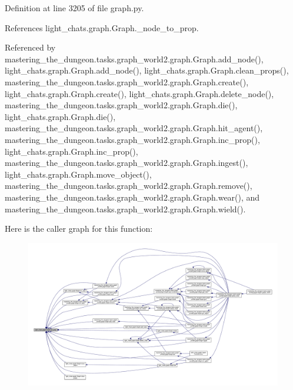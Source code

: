 Definition at line 3205 of file graph.\+py.



References light\+\_\+chats.\+graph.\+Graph.\+\_\+node\+\_\+to\+\_\+prop.



Referenced by mastering\+\_\+the\+\_\+dungeon.\+tasks.\+graph\+\_\+world2.\+graph.\+Graph.\+add\+\_\+node(), light\+\_\+chats.\+graph.\+Graph.\+add\+\_\+node(), light\+\_\+chats.\+graph.\+Graph.\+clean\+\_\+props(), mastering\+\_\+the\+\_\+dungeon.\+tasks.\+graph\+\_\+world2.\+graph.\+Graph.\+create(), light\+\_\+chats.\+graph.\+Graph.\+create(), light\+\_\+chats.\+graph.\+Graph.\+delete\+\_\+node(), mastering\+\_\+the\+\_\+dungeon.\+tasks.\+graph\+\_\+world2.\+graph.\+Graph.\+die(), light\+\_\+chats.\+graph.\+Graph.\+die(), mastering\+\_\+the\+\_\+dungeon.\+tasks.\+graph\+\_\+world2.\+graph.\+Graph.\+hit\+\_\+agent(), mastering\+\_\+the\+\_\+dungeon.\+tasks.\+graph\+\_\+world2.\+graph.\+Graph.\+inc\+\_\+prop(), light\+\_\+chats.\+graph.\+Graph.\+inc\+\_\+prop(), mastering\+\_\+the\+\_\+dungeon.\+tasks.\+graph\+\_\+world2.\+graph.\+Graph.\+ingest(), light\+\_\+chats.\+graph.\+Graph.\+move\+\_\+object(), mastering\+\_\+the\+\_\+dungeon.\+tasks.\+graph\+\_\+world2.\+graph.\+Graph.\+remove(), mastering\+\_\+the\+\_\+dungeon.\+tasks.\+graph\+\_\+world2.\+graph.\+Graph.\+wear(), and mastering\+\_\+the\+\_\+dungeon.\+tasks.\+graph\+\_\+world2.\+graph.\+Graph.\+wield().

Here is the caller graph for this function\+:
\nopagebreak
\begin{figure}[H]
\begin{center}
\leavevmode
\includegraphics[width=350pt]{classlight__chats_1_1graph_1_1Graph_ae2c69adb1ea1477aaa6d9af693b30fa1_icgraph}
\end{center}
\end{figure}
\mbox{\label{classlight__chats_1_1graph_1_1Graph_a3d44dae0701925da960433cb98229c21}} 

